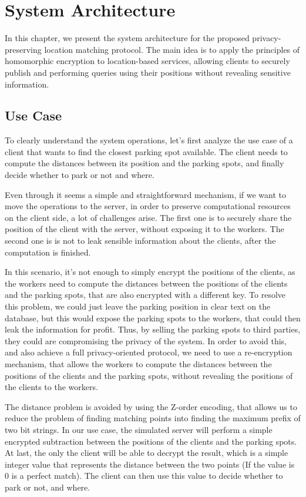 \chapter{System Architecture}
In this chapter, we present the system architecture for the proposed privacy-preserving location matching protocol. The main idea is to apply the principles of homomorphic encryption to location-based services, allowing clients to securely publish and performing queries using their positions without revealing sensitive information.

\section{Use Case}
To clearly understand the system operations, let's first analyze the use case of a client that wants to find the closest parking spot available. The client needs to compute the distances between its position and the parking spots, and finally decide whether to park or not and where.

Even through it seems a simple and straightforward mechanism, if we want to move the operations to the server, in order to preserve computational resources on the client side, a lot of challenges arise. The first one is to securely share the position of the client with the server, without exposing it to the workers. The second one is is not to leak sensible information about the clients, after the computation is finished.

In this scenario, it's not enough to simply encrypt the positions of the clients, as the workers need to compute the distances between the positions of the clients and the parking spots, that are also encrypted with a different key. To resolve this problem, we could just leave the parking position in clear text on the database, but this would expose the parking spots to the workers, that could then leak the information for profit. Thus, by selling the parking spots to third parties, they could are compromising the privacy of the system. In order to avoid this, and also achieve a full privacy-oriented protocol, we need to use a re-encryption mechanism, that allows the workers to compute the distances between the positions of the clients and the parking spots, without revealing the positions of the clients to the workers.

The distance problem is avoided by using the Z-order encoding, that allows us to reduce the problem of finding matching points into finding the maximum prefix of two bit strings. In our use case, the simulated server will perform a simple encrypted subtraction between the positions of the clients and the parking spots. At last, the only the client will be able to decrypt the result, which is a simple integer value that represents the distance between the two points (If the value is 0 is a perfect match). The client can then use this value to decide whether to park or not, and where. 

